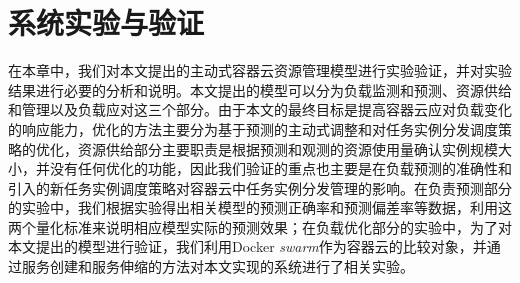 
\chapter{系统实验与验证}\label{chap:sys_eval}
在本章中，我们对本文提出的主动式容器云资源管理模型进行实验验证，并对实验结果进行必要的分析和说明。本文提出的模型可以分为负载监测和预测、资源供给和管理以及负载应对这三个部分。由于本文的最终目标是提高容器云应对负载变化的响应能力，优化的方法主要分为基于预测的主动式调整和对任务实例分发调度策略的优化，资源供给部分主要职责是根据预测和观测的资源使用量确认实例规模大小，并没有任何优化的功能，因此我们验证的重点也主要是在负载预测的准确性和引入的新任务实例调度策略对容器云中任务实例分发管理的影响。在负责预测部分的实验中，我们根据实验得出相关模型的预测正确率和预测偏差率等数据，利用这两个量化标准来说明相应模型实际的预测效果；在负载优化部分的实验中，为了对本文提出的模型进行验证，我们利用Docker \emph{swarm}作为容器云的比较对象，并通过服务创建和服务伸缩的方法对本文实现的系统进行了相关实验。

